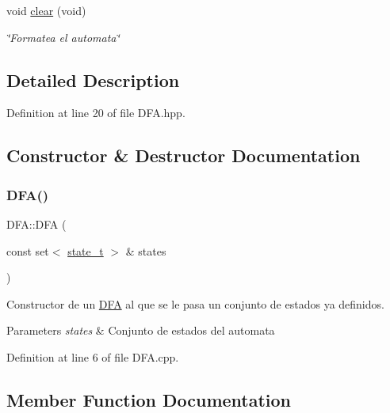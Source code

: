 \begin{DoxyCompactItemize}
\mbox{\label{class_d_f_a_a2abcdde01c9833f97b99c9d1c7e739aa}} 
void \hyperlink{class_d_f_a_a2abcdde01c9833f97b99c9d1c7e739aa}{clear} (void)
\begin{DoxyCompactList}\small\item\em \char`\"{}\+Formatea el automata\char`\"{} \end{DoxyCompactList}\end{DoxyCompactItemize}


\subsection{Detailed Description}


Definition at line 20 of file D\+F\+A.\+hpp.



\subsection{Constructor \& Destructor Documentation}
\mbox{\label{class_d_f_a_a58748588a492bf8c3f5dd9bb1310aa41}} 
\subsubsection{\texorpdfstring{D\+F\+A()}{DFA()}}
{\footnotesize\ttfamily D\+F\+A\+::\+D\+FA (\begin{DoxyParamCaption}\item[{const set$<$ \hyperlink{classstate__t}{state\+\_\+t} $>$ \&}]{states }\end{DoxyParamCaption})}



Constructor de un \hyperlink{class_d_f_a}{D\+FA} al que se le pasa un conjunto de estados ya definidos. 


\begin{DoxyParams}{Parameters}
{\em states} & Conjunto de estados del automata \\
\hline
\end{DoxyParams}


Definition at line 6 of file D\+F\+A.\+cpp.



\subsection{Member Function Documentation}
\mbox{\label{class_d_f_a_a0884e79fd0a48a42e49fe7854a19628d}} 
